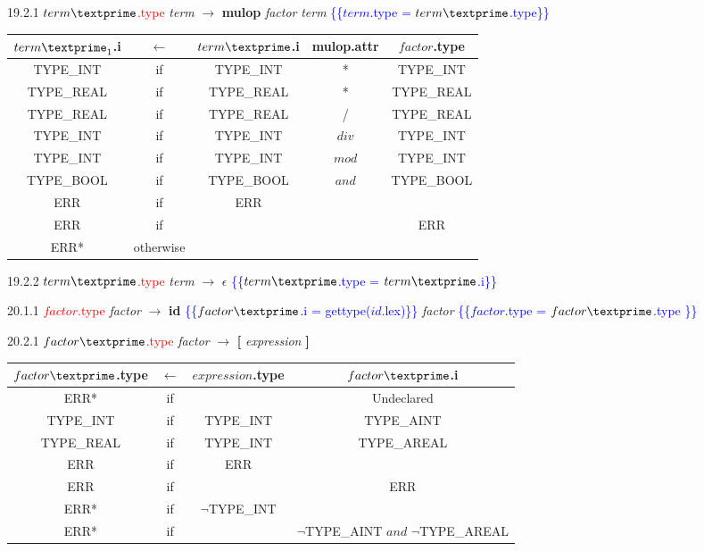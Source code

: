\documentclass[10pt]{article}
\begin{document}
19.2.1 \textcolor{red}{$term\textprime$.type} \emph{term\textprime} $\rightarrow$ \textbf{mulop} \emph{factor} \emph{term\textprime} \textcolor{blue}{\{\{$term$.type = $term\textprime$.type\}\}}

\begin{tabular}[t]{|c|c|c|c|c|}
  \hline

 $term\textprime_1$.i & \textbf{$\leftarrow$} & $term\textprime$.i & \textbf{mulop}.attr &  $factor$.type \\

  \hline

  TYPE_INT & if & TYPE_INT & * & TYPE_INT \\
  TYPE_REAL & if & TYPE_REAL & * & TYPE_REAL \\
  TYPE_REAL & if & TYPE_REAL & / & TYPE_REAL \\
  TYPE_INT & if & TYPE_INT & $div$ & TYPE_INT \\
  TYPE_INT & if & TYPE_INT & $mod$ & TYPE_INT \\
  TYPE_BOOL & if & TYPE_BOOL & $and$ & TYPE_BOOL \\
  ERR & if & ERR & & \\
  ERR & if & & & ERR \\
  ERR* & otherwise & & & \\
  \hline

\end{tabular}

19.2.2 \textcolor{red}{$term\textprime$.type} \emph{term\textprime} $\rightarrow$ $\epsilon$ \textcolor{blue}{\{\{$term\textprime$.type = $term\textprime$.i\}\}}

\clearpage{}
20.1.1 \textcolor{red}{$factor$.type} \emph{factor} $\rightarrow$ \textbf{id} \textcolor{blue}{\{\{$factor\textprime$.i = gettype($id$.lex)\}\}} \emph{factor\textprime} \textcolor{blue}{\{\{$factor$.type = $factor\textprime$.type \}\}}

20.2.1 \textcolor{red}{$factor\textprime$.type} \emph{factor\textprime} $\rightarrow$ \textbf{[} \emph{expression} \textbf{]}

\begin{tabular}[t]{|c|c|c|c|}
  \hline

  $factor\textprime$.type & \textbf{$\leftarrow$} & $expression$.type & $factor\textprime$.i \\

  \hline
  ERR* & if & & Undeclared \\
  TYPE_INT & if & TYPE_INT & TYPE_AINT \\
  TYPE_REAL & if & TYPE_INT & TYPE_AREAL \\
  ERR & if & ERR & \\
  ERR & if & & ERR \\
  ERR* & if & $\neg$TYPE_INT & \\
  ERR* & if & & $\neg$TYPE_AINT $and$ $\neg$TYPE_AREAL \\

  \hline

\end{tabular}
\end{document}
